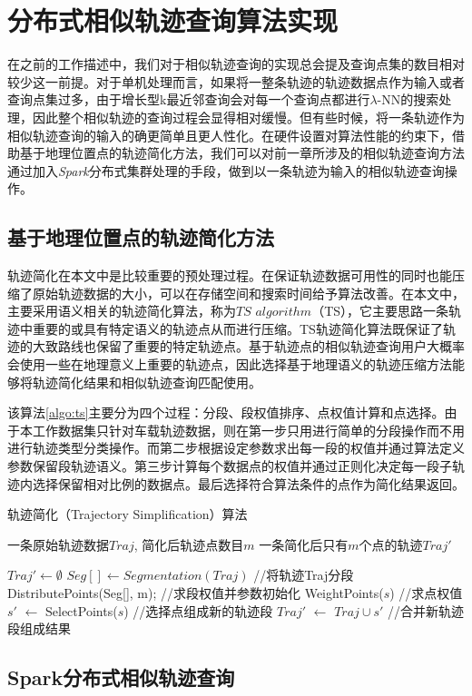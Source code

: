 

\section{分布式相似轨迹查询算法实现}
\label{sec:distributed algo}
在之前的工作描述中，我们对于相似轨迹查询的实现总会提及查询点集的数目相对较少这一前提。对于单机处理而言，如果将一整条轨迹的轨迹数据点作为输入或者查询点集过多，由于增长型k最近邻查询会对每一个查询点都进行$\lambda$-NN的搜索处理，因此整个相似轨迹的查询过程会显得相对缓慢。但有些时候，将一条轨迹作为相似轨迹查询的输入的确更简单且更人性化。在硬件设置对算法性能的约束下，借助基于地理位置点的轨迹简化方法，我们可以对前一章所涉及的相似轨迹查询方法通过加入\emph{Spark}分布式集群处理的手段，做到以一条轨迹为输入的相似轨迹查询操作。

\subsection{基于地理位置点的轨迹简化方法}
\label{subsec:trajectory simplification based on locations}
轨迹简化在本文中是比较重要的预处理过程。在保证轨迹数据可用性的同时也能压缩了原始轨迹数据的大小，可以在存储空间和搜索时间给予算法改善。在本文中，主要采用语义相关的轨迹简化算法，称为$TS$ $algorithm$（TS），它主要思路一条轨迹中重要的或具有特定语义的轨迹点从而进行压缩。TS轨迹简化算法既保证了轨迹的大致路线也保留了重要的特定轨迹点。基于轨迹点的相似轨迹查询用户大概率会使用一些在地理意义上重要的轨迹点，因此选择基于地理语义的轨迹压缩方法能够将轨迹简化结果和相似轨迹查询匹配使用。

该算法\ref{algo:ts}主要分为四个过程：分段、段权值排序、点权值计算和点选择。由于本工作数据集只针对车载轨迹数据，则在第一步只用进行简单的分段操作而不用进行轨迹类型分类操作。而第二步根据设定参数求出每一段的权值并通过算法定义参数保留段轨迹语义。第三步计算每个数据点的权值并通过正则化决定每一段子轨迹内选择保留相对比例的数据点。最后选择符合算法条件的点作为简化结果返回。
\\

\begin{algorithm}
\caption{轨迹简化（Trajectory Simplification）算法}
\label{algo:ts}
\begin{algorithmic}[1] %
\Require 一条原始轨迹数据$Traj$, 简化后轨迹点数目$m$ %
\Ensure 一条简化后只有$m$个点的轨迹$Traj'$ %

\State $Traj' \gets \emptyset$
\State $Seg[] \gets Segmentation(Traj)$ //将轨迹Traj分段
\State DistributePoints(Seg[], m);	//求段权值并参数初始化
	\State WeightPoints($s$)	//求点权值
    \State $s'$ $\gets$ SelectPoints($s$)	//选择点组成新的轨迹段
    \State $Traj'$ $\gets$ $Traj \cup s'$	//合并新轨迹段组成结果
  \EndFor
\end{algorithmic}
\end{algorithm}

\subsection{Spark分布式相似轨迹查询}
\label{subsec:dis algo similar traj}